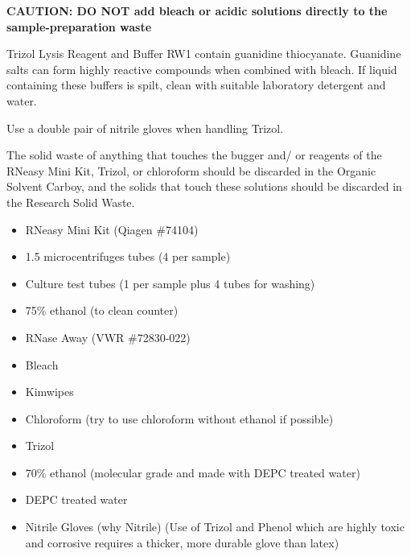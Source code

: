 \documentclass[11pt, oneside]{article}
\begin{document}
		\vspace{5mm}
		
		
		\vspace{3mm}
		
		\begin{adjustwidth}{0.5in}{0pt} {\bf CAUTION: DO NOT add bleach or acidic solutions directly to the sample-preparation waste}
		\end{adjustwidth}
		
		\vspace{3mm}
		
		\noindent Trizol Lysis Reagent and Buffer RW1 contain guanidine thiocyanate. Guanidine salts can form highly reactive compounds when 			combined with bleach. If liquid containing these buffers is spilt, clean with suitable laboratory detergent and water.
		
		\vspace{3mm}
		
		\noindent Use a double pair of nitrile gloves when handling Trizol. 
		
		\vspace{3mm}
		
		\noindent The solid waste of anything that touches the bugger and/ or reagents of the RNeasy Mini Kit, Trizol, or chloroform should be discarded in 		the Organic Solvent Carboy, and the solids that touch these solutions should be discarded in the Research Solid Waste.
 
		\vspace{5mm}
		
		
		\begin{itemize}
			\itemsep0em
			\item RNeasy Mini Kit (Qiagen \#74104)		
			\item 1.5 microcentrifuges tubes (4 per sample)	
			\item Culture test tubes (1 per sample plus 4 tubes for washing) 
			\item 75\% ethanol (to clean counter) 
			\item RNase Away (VWR \#72830-022)
			\item Bleach
			\item Kimwipes 
			\item Chloroform (try to use chloroform without ethanol if possible)
			\item Trizol
			\item 70\% ethanol (molecular grade and made with DEPC treated water)
			\item DEPC treated water
			\item Nitrile Gloves (why Nitrile) (Use of Trizol and Phenol which are highly toxic and corrosive requires a thicker, more durable glove than 			latex) 
 		\end{itemize}
\end{document}
